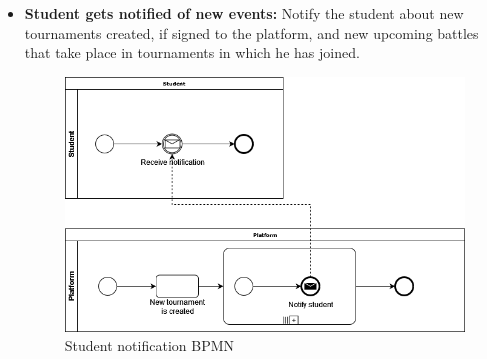 \documentclass{article}
\begin{document}
{\begin{itemize}
            \item \textbf{Student gets notified of new events:} Notify the student about new tournaments created, if signed to the platform, and new upcoming battles that take place in tournaments in which he has joined.
            \begin{figure}[H]
                \centering
                \includegraphics[scale=0.4]{images/BPMN/BPMN5.png}
                \caption{Student notification BPMN}
                \label{fig:studNotificationBPMN}
            \end{figure}
            

\end{itemize}}
\end{document}
